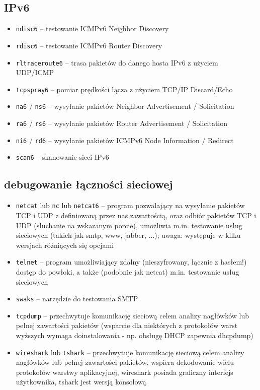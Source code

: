 \subsection{IPv6}
\begin{itemize}
	\item \Verb#ndisc6# –
		testowanie ICMPv6 Neighbor Discovery
	\item \Verb#rdisc6# –
		testowanie ICMPv6 Router Discovery
	\item \Verb#rltraceroute6# –
		trasa pakietów do danego hosta IPv6 z użyciem UDP/ICMP
	\item \Verb#tcpspray6# –
		pomiar prędkości łącza z użyciem TCP/IP Discard/Echo
	
	\item \Verb#na6# / \Verb#ns6# –
		wysyłanie pakietów Neighbor Advertisement / Solicitation
	\item \Verb#ra6# / \Verb#rs6# –
		wysyłanie pakietów Router Advertisement / Solicitation
	\item \Verb#ni6# / \Verb#rd6# –
		wysyłanie pakietów ICMPv6 Node Information / Redirect
	\item \Verb#scan6# –
		skanowanie sieci IPv6
\end{itemize}

\subsection{debugowanie łączności sieciowej}
\begin{itemize}
	\item \Verb#netcat# lub \Verb#nc# lub \Verb#netcat6# –
		program pozwalający na wysyłanie pakietów TCP i UDP z definiowaną przez nas zawartością, oraz odbiór pakietów TCP i UDP (słuchanie na wskazanym porcie), umożliwia m.in. testowanie usług sieciowych (takich jak smtp, www, jabber, ...); uwaga: występuje w kilku wersjach różniących się opcjami
	\item \Verb#telnet# –
		program umożliwiający zdalny (nieszyfrowany, łącznie z hasłem!) dostęp do powłoki, a także (podobnie jak netcat) m.in. testowanie usług sieciowych
	
	\item \Verb#swaks# –
		narzędzie do testowania SMTP
	
	\item \Verb#tcpdump# –
		przechwytuje komunikację sieciową celem analizy nagłówków lub pełnej zawartości pakietów
		(wsparcie dla niektórych z protokołów warst wyższych wymaga doinstalowania - np. obsługę DHCP zapewnia dhcpdump)
	\item \Verb#wireshark# lub \Verb#tshark# –
		przechwytuje komunikację sieciową celem analizy nagłówków lub pełnej zawartości pakietów, wspiera dekodowanie wielu protokołów warstwy aplikacyjnej, wireshark posiada graficzny interfejs użytkownika, tshark jest wersją konsolową
\end{itemize}

